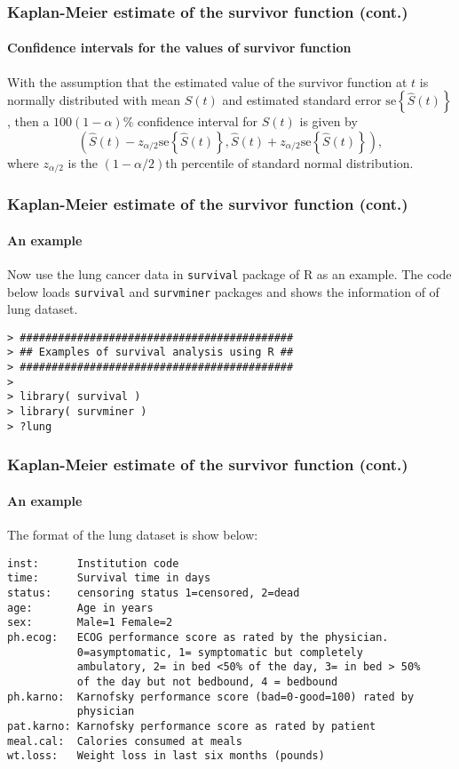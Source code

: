 \documentclass{beamer}
\begin{document}
	\begin{frame}
		\frametitle{Kaplan-Meier estimate of the survivor function (cont.)}
		\framesubtitle{Confidence intervals for the values of survivor function}
		With the assumption that the estimated value of the survivor function at $t$ is normally distributed with mean $S( t )$ and estimated standard error $\text{se}\left\{ \hat{ S }( t ) \right\}$, then a $100( 1 - \alpha)\%$ confidence interval for $S( t )$ is given by
		\[ \left( \hat{ S }( t ) - z_{ \alpha / 2 } \text{se}\left\{ \hat{ S }( t ) \right\}, \hat{ S }( t ) + z_{ \alpha / 2 } \text{se}\left\{ \hat{ S }( t ) \right\} \right), \]
		where $z_{ \alpha / 2 }$ is the $( 1 - \alpha / 2 )$th percentile of standard normal distribution.
	\end{frame}
	
	\begin{frame}[fragile]
		\frametitle{Kaplan-Meier estimate of the survivor function (cont.)}
		\framesubtitle{An example}
		Now use the lung cancer data in \texttt{survival} package of R as an example.
		The code below loads \texttt{survival} and \texttt{survminer} packages and shows the information of of lung dataset.
		\begin{Verbatim}
> ###########################################
> ## Examples of survival analysis using R ##
> ###########################################
> 
> library( survival )
> library( survminer )
> ?lung
		\end{Verbatim}
	\end{frame}
	
		\begin{frame}[fragile]
		\frametitle{Kaplan-Meier estimate of the survivor function (cont.)}
		\framesubtitle{An example}
		The format of the lung dataset is show below:
		\begin{Verbatim}[fontsize=\small]
inst:      Institution code
time:      Survival time in days
status:    censoring status 1=censored, 2=dead
age:       Age in years
sex:       Male=1 Female=2
ph.ecog:   ECOG performance score as rated by the physician. 
           0=asymptomatic, 1= symptomatic but completely
           ambulatory, 2= in bed <50% of the day, 3= in bed > 50% 
           of the day but not bedbound, 4 = bedbound
ph.karno:  Karnofsky performance score (bad=0-good=100) rated by 
           physician
pat.karno: Karnofsky performance score as rated by patient
meal.cal:  Calories consumed at meals
wt.loss:   Weight loss in last six months (pounds)
		\end{Verbatim}
	\end{frame}

	\begin{frame}[allowframebreaks]
		\begin{singlespace}
			
			
		\end{singlespace}
	\end{frame}
\end{document}
